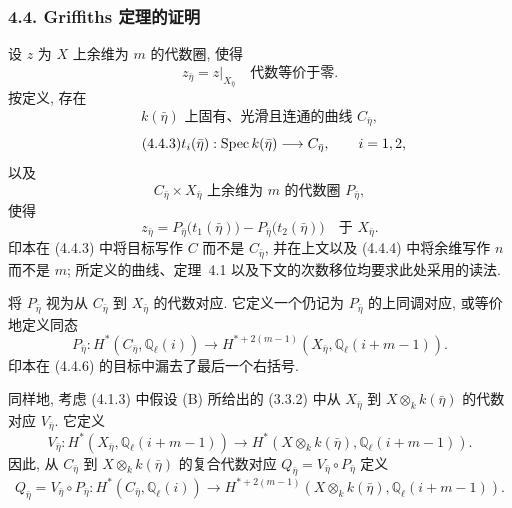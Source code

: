\subsubsection*{4.4. Griffiths 定理的证明}

设 $z$ 为 $X$ 上余维为 $m$ 的代数圈, 使得
\begin{equation}\tag{4.4.1}
z_{\bar\eta}=z|_{X_{\bar\eta}}
\quad\text{代数等价于零}.
\end{equation}
按定义, 存在
\begin{equation}\tag{4.4.2}
\text{$k(\bar\eta)$ 上固有、光滑且连通的曲线 $C_{\bar\eta}$},
\end{equation}
\begin{equation}\tag{4.4.3}
t_i(\bar\eta):\operatorname{Spec} k(\bar\eta)\longrightarrow C_{\bar\eta},
\qquad i=1,2,
\end{equation}
以及
\begin{equation}\tag{4.4.4}
\text{$C_{\bar\eta}\times X_{\bar\eta}$ 上余维为 $m$ 的代数圈 $P_{\bar\eta}$},
\end{equation}
使得
\begin{equation}\tag{4.4.5}
z_{\bar\eta}
=P_{\bar\eta}\bigl(t_1(\bar\eta)\bigr)
-P_{\bar\eta}\bigl(t_2(\bar\eta)\bigr)
\quad\text{于 }X_{\bar\eta}.
\end{equation}
印本在 (4.4.3) 中将目标写作 $C$ 而不是 $C_{\bar\eta}$, 并在上文以及 (4.4.4) 中将余维写作 $n$ 而不是 $m$; 所定义的曲线、定理~4.1 以及下文的次数移位均要求此处采用的读法.

将 $P_{\bar\eta}$ 视为从 $C_{\bar\eta}$ 到 $X_{\bar\eta}$ 的代数对应. 它定义一个仍记为 $P_{\bar\eta}$ 的上同调对应, 或等价地定义同态
\begin{equation}\tag{4.4.6}
P_{\bar\eta}:H^*(C_{\bar\eta},\mathbb Q_\ell(i))
\longrightarrow
H^{*+2(m-1)}(X_{\bar\eta},\mathbb Q_\ell(i+m-1)).
\end{equation}
印本在 (4.4.6) 的目标中漏去了最后一个右括号.

同样地, 考虑 (4.1.3) 中假设 (B) 所给出的 (3.3.2) 中从 $X_{\bar\eta}$ 到 $X\otimes_k k(\bar\eta)$ 的代数对应 $V_{\bar\eta}$. 它定义
\begin{equation}\tag{4.4.7}
V_{\bar\eta}:H^*(X_{\bar\eta},\mathbb Q_\ell(i+m-1))
\longrightarrow
H^*(X\otimes_k k(\bar\eta),\mathbb Q_\ell(i+m-1)).
\end{equation}
因此, 从 $C_{\bar\eta}$ 到 $X\otimes_k k(\bar\eta)$ 的复合代数对应 $Q_{\bar\eta}=V_{\bar\eta}\circ P_{\bar\eta}$ 定义
\begin{equation}\tag{4.4.8}
Q_{\bar\eta}=V_{\bar\eta}\circ P_{\bar\eta}:
H^*(C_{\bar\eta},\mathbb Q_\ell(i))
\longrightarrow
H^{*+2(m-1)}(X\otimes_k k(\bar\eta),\mathbb Q_\ell(i+m-1)).
\end{equation}

